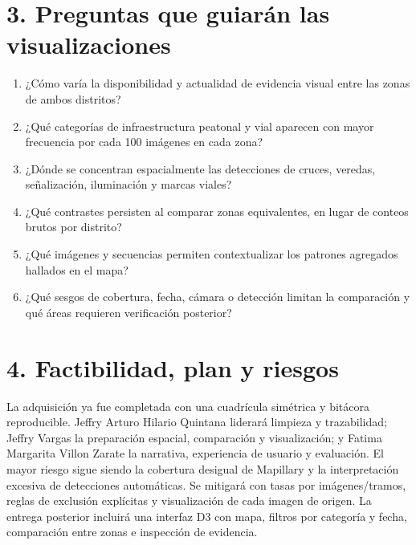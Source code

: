 \documentclass[10pt]{article}
\begin{document}
\section*{3. Preguntas que guiarán las visualizaciones}

\begin{enumerate}
  \item ¿Cómo varía la disponibilidad y actualidad de evidencia visual entre las zonas de ambos distritos?
  \item ¿Qué categorías de infraestructura peatonal y vial aparecen con mayor frecuencia por cada 100 imágenes en cada zona?
  \item ¿Dónde se concentran espacialmente las detecciones de cruces, veredas, señalización, iluminación y marcas viales?
  \item ¿Qué contrastes persisten al comparar zonas equivalentes, en lugar de conteos brutos por distrito?
  \item ¿Qué imágenes y secuencias permiten contextualizar los patrones agregados hallados en el mapa?
  \item ¿Qué sesgos de cobertura, fecha, cámara o detección limitan la comparación y qué áreas requieren verificación posterior?
\end{enumerate}

\section*{4. Factibilidad, plan y riesgos}

La adquisición ya fue completada con una cuadrícula simétrica y bitácora reproducible. Jeffry Arturo Hilario Quintana liderará limpieza y trazabilidad; Jeffry Vargas la preparación espacial, comparación y visualización; y Fatima Margarita Villon Zarate la narrativa, experiencia de usuario y evaluación. El mayor riesgo sigue siendo la cobertura desigual de Mapillary y la interpretación excesiva de detecciones automáticas. Se mitigará con tasas por imágenes/tramos, reglas de exclusión explícitas y visualización de cada imagen de origen. La entrega posterior incluirá una interfaz D3 con mapa, filtros por categoría y fecha, comparación entre zonas e inspección de evidencia.
\end{document}
